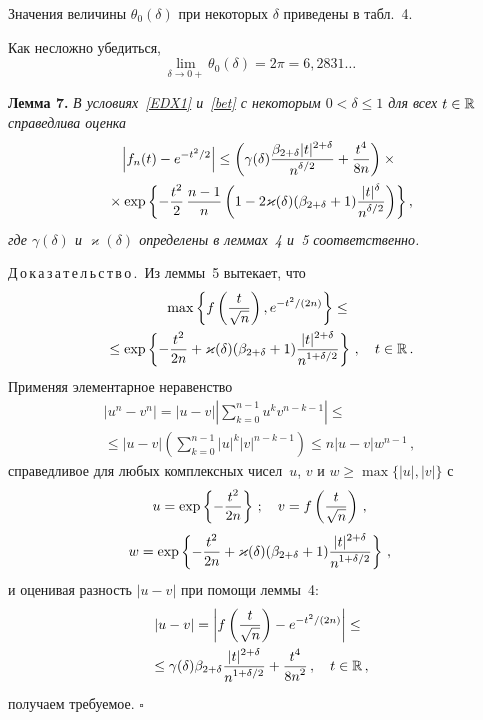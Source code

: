 \begin{multicols}{2}
Значения величины $\theta_0(\delta)$ при некоторых $\delta$ приведены в
табл.~4.

Как несложно убедиться,
$$
\lim_{\delta\to0+}\theta_0(\delta)=2\pi=6{,}2831\ldots
$$

\noindent
\textbf{Лемма 7.}
\textit{В условиях~\eqref{EDX1} и~\eqref{bet} с некоторым ${0<\delta\le1}$ для
всех $t\in\R$ справедлива оценка
\begin{multline*}
\left|f_n(t)- e^{-t^2/2}\right|\le \left(\gamma(\delta)
\fr{\bet|t|^{2+\delta}}{n^{\delta/2}}+ \fr{t^4}{8n}\right)\times{}\\
{}\times
\exp\left\{-\fr{t^2}{2}\,\fr{n-1}n \left(1-
2\varkappa(\delta)(\bet+1)\fr{|t|^{\delta}}{n^{\delta/2}} \right)\right\},
\end{multline*}
где $\gamma(\delta)$ и $\varkappa(\delta)$ определены в
леммах~4 и~5 соответственно.
}

\smallskip

\noindent
Д\,о\,к\,а\,з\,а\,т\,е\,л\,ь\,с\,т\,в\,о\,.\ Из леммы~5 вытекает, что
\begin{multline*}
\max\left\{f\left(\fr t{\sqrt n}\right),e^{-t^2/(2n)}\right\}\le{}\\
{}\le
\exp\left\{-\fr{t^2}{2n}+
\varkappa(\delta)(\bet+1)\fr{|t|^{2+\delta}}{n^{1+\delta/2}} \right\}\,,\quad
t\in\R\,.
\end{multline*}
Применяя элементарное неравенство
\begin{multline*}
\left|u^n-v^n\right|= |u-v|\left \vert
\sum\limits_{k=0}^{n-1}{u^kv^{n-k-1}}\right \vert
\le{}\\
{}\le |u-v|\left(\sum\limits_{k=0}^{n-1}|u|^k|v|^{n-k-1}\right)\le
n|u-v|w^{n-1}\,,
\end{multline*}
справедливое для любых комплексных чисел~$u$, $v$ и
$w\ge\max\{|u|,|v|\}$ с
$$
u=\exp\left\{-\fr{t^2}{2n}\right\}\,;\quad v=f\left(\fr t{\sqrt
n}\right)\,,
$$
$$
w=\exp\left\{-\fr{t^2}{2n}+
\varkappa(\delta)(\bet+1)\fr{|t|^{2+\delta}}{n^{1+\delta/2}} \right\}\,,
$$
и оценивая разность $|u-v|$ при помощи
леммы~4:
\begin{multline*}
|u-v|=\left|f\left(\fr t{\sqrt n}\right)- e^{-t^2/(2n)}\right|\le{}\\
{}\le
\gamma(\delta)\bet \fr{|t|^{2+\delta}}{n^{1+\delta/2}}+ \fr{t^4}{8n^2}\,,\quad
t\in\R\,,
\end{multline*}
получаем требуемое.  $\square$


\end{multicols}

